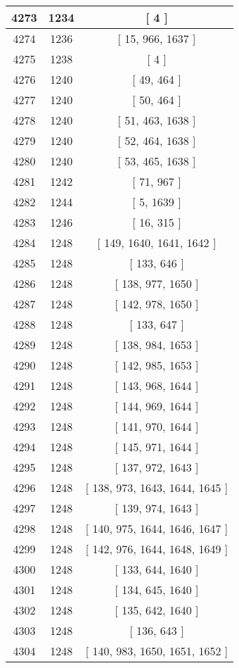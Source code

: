 \begin{center}
\begin{longtable}[H]{|| c c c ||}
\hline
4273 & 1234 & [ 4 ] \\ 
\hline
4274 & 1236 & [ 15, 966, 1637 ] \\ 
\hline
4275 & 1238 & [ 4 ] \\ 
\hline
4276 & 1240 & [ 49, 464 ] \\ 
\hline
4277 & 1240 & [ 50, 464 ] \\ 
\hline
4278 & 1240 & [ 51, 463, 1638 ] \\ 
\hline
4279 & 1240 & [ 52, 464, 1638 ] \\ 
\hline
4280 & 1240 & [ 53, 465, 1638 ] \\ 
\hline
4281 & 1242 & [ 71, 967 ] \\ 
\hline
4282 & 1244 & [ 5, 1639 ] \\ 
\hline
4283 & 1246 & [ 16, 315 ] \\ 
\hline
4284 & 1248 & [ 149, 1640, 1641, 1642 ] \\ 
\hline
4285 & 1248 & [ 133, 646 ] \\ 
\hline
4286 & 1248 & [ 138, 977, 1650 ] \\ 
\hline
4287 & 1248 & [ 142, 978, 1650 ] \\ 
\hline
4288 & 1248 & [ 133, 647 ] \\ 
\hline
4289 & 1248 & [ 138, 984, 1653 ] \\ 
\hline
4290 & 1248 & [ 142, 985, 1653 ] \\ 
\hline
4291 & 1248 & [ 143, 968, 1644 ] \\ 
\hline
4292 & 1248 & [ 144, 969, 1644 ] \\ 
\hline
4293 & 1248 & [ 141, 970, 1644 ] \\ 
\hline
4294 & 1248 & [ 145, 971, 1644 ] \\ 
\hline
4295 & 1248 & [ 137, 972, 1643 ] \\ 
\hline
4296 & 1248 & [ 138, 973, 1643, 1644, 1645 ] \\ 
\hline
4297 & 1248 & [ 139, 974, 1643 ] \\ 
\hline
4298 & 1248 & [ 140, 975, 1644, 1646, 1647 ] \\ 
\hline
4299 & 1248 & [ 142, 976, 1644, 1648, 1649 ] \\ 
\hline
4300 & 1248 & [ 133, 644, 1640 ] \\ 
\hline
4301 & 1248 & [ 134, 645, 1640 ] \\ 
\hline
4302 & 1248 & [ 135, 642, 1640 ] \\ 
\hline
4303 & 1248 & [ 136, 643 ] \\ 
\hline
4304 & 1248 & [ 140, 983, 1650, 1651, 1652 ] \\ 

\end{longtable}
\end{center}
